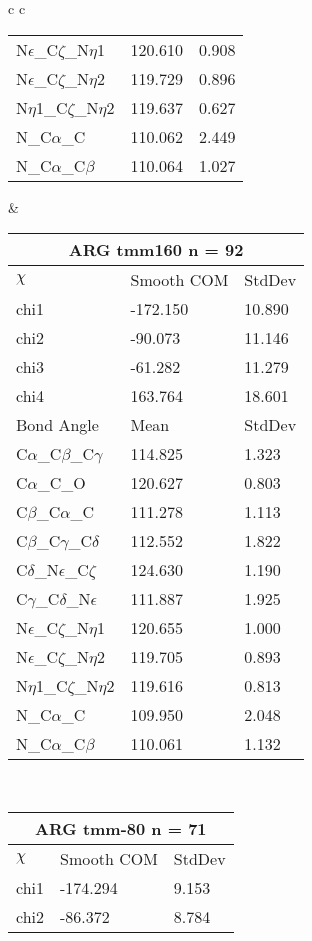 \begin{longtable}{ c c }
\begin{tabular}{ l l l }
  N$\epsilon$\_C$\zeta$\_N$\eta$1 & 120.610 & 0.908\\
  N$\epsilon$\_C$\zeta$\_N$\eta$2 & 119.729 & 0.896\\
  N$\eta$1\_C$\zeta$\_N$\eta$2 & 119.637 & 0.627\\
  N\_C$\alpha$\_C & 110.062 & 2.449\\
  N\_C$\alpha$\_C$\beta$ & 110.064 & 1.027\\
  \bottomrule
  \end{tabular}
  &
  \begin{tabular}{ l l l }
  \toprule
  \multicolumn{3}{c}{ARG \textbf{tmm160} n = 92} \\ \toprule
  $\chi$       & Smooth COM & StdDev \\ \midrule
  chi1 & -172.150 & 10.890 \\ 
  chi2 & -90.073 & 11.146 \\ 
  chi3 & -61.282 & 11.279 \\ 
  chi4 & 163.764 & 18.601 \\ \midrule
  Bond Angle   & Mean     & StdDev \\ \midrule
  C$\alpha$\_C$\beta$\_C$\gamma$ & 114.825 & 1.323\\
  C$\alpha$\_C\_O & 120.627 & 0.803\\
  C$\beta$\_C$\alpha$\_C & 111.278 & 1.113\\
  C$\beta$\_C$\gamma$\_C$\delta$ & 112.552 & 1.822\\
  C$\delta$\_N$\epsilon$\_C$\zeta$ & 124.630 & 1.190\\
  C$\gamma$\_C$\delta$\_N$\epsilon$ & 111.887 & 1.925\\
  N$\epsilon$\_C$\zeta$\_N$\eta$1 & 120.655 & 1.000\\
  N$\epsilon$\_C$\zeta$\_N$\eta$2 & 119.705 & 0.893\\
  N$\eta$1\_C$\zeta$\_N$\eta$2 & 119.616 & 0.813\\
  N\_C$\alpha$\_C & 109.950 & 2.048\\
  N\_C$\alpha$\_C$\beta$ & 110.061 & 1.132\\
  \bottomrule
  \end{tabular}
  \\
  \begin{tabular}{ l l l }
  \toprule
  \multicolumn{3}{c}{ARG \textbf{tmm-80} n = 71} \\ \toprule
  $\chi$       & Smooth COM & StdDev \\ \midrule
  chi1 & -174.294 & 9.153 \\ 
  chi2 & -86.372 & 8.784 \\ 

\end{tabular}
\end{longtable}
